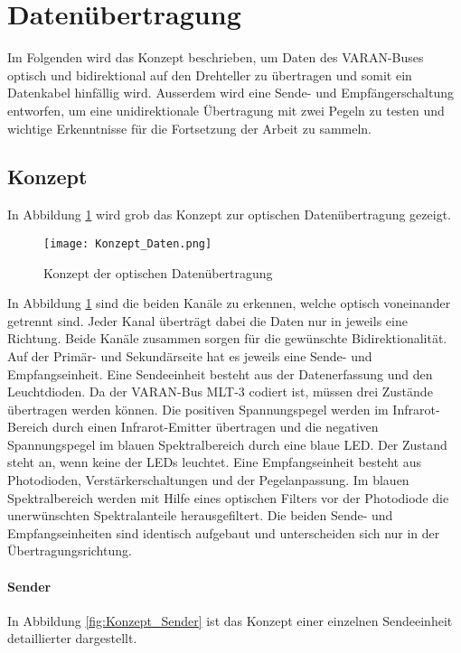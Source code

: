 \section{Datenübertragung}
\label{sec:Daten}
Im Folgenden wird das Konzept beschrieben, um Daten des VARAN-Buses optisch und bidirektional auf den Drehteller zu übertragen und somit ein Datenkabel hinfällig wird. Ausserdem wird eine Sende- und Empfängerschaltung entworfen, um eine unidirektionale Übertragung mit zwei Pegeln zu testen und wichtige Erkenntnisse für die Fortsetzung der Arbeit zu sammeln.  
\subsection{Konzept}
In Abbildung \ref{fig:Konzept_Daten} wird grob das Konzept zur optischen Datenübertragung gezeigt.

\begin{figure}[h]
	\centering
	\texttt{[image: Konzept\_Daten.png]}
	\caption{Konzept der optischen Datenübertragung}\label{fig:Konzept_Daten}
\end{figure}

In Abbildung \ref{fig:Konzept_Daten} sind die beiden Kanäle zu erkennen, welche optisch voneinander getrennt sind. Jeder Kanal überträgt dabei die Daten nur in jeweils eine Richtung. Beide Kanäle zusammen sorgen für die gewünschte Bidirektionalität. Auf der Primär- und Sekundärseite hat es jeweils eine Sende- und Empfangseinheit. 
\newline
Eine Sendeeinheit besteht aus der Datenerfassung und den Leuchtdioden. Da der VARAN-Bus MLT-3 codiert ist, müssen drei Zustände übertragen werden können. Die positiven Spannungspegel werden im Infrarot-Bereich durch einen Infrarot-Emitter übertragen und die negativen Spannungspegel im blauen Spektralbereich durch eine blaue LED. Der Zustand \grqq steht an, wenn keine der LEDs leuchtet.
\newline
Eine Empfangseinheit besteht aus Photodioden, Verstärkerschaltungen und der Pegelanpassung. Im blauen Spektralbereich werden mit Hilfe eines optischen Filters vor der Photodiode die unerwünschten Spektralanteile herausgefiltert.
\newline Die beiden Sende- und Empfangseinheiten sind identisch aufgebaut und unterscheiden sich nur in der Übertragungsrichtung.

\paragraph{Sender}
In Abbildung \ref{fig:Konzept_Sender} ist das Konzept einer einzelnen Sendeeinheit detaillierter dargestellt.

